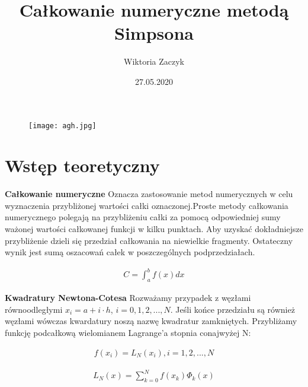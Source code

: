 \documentclass{article}
\begin{document}
\title{Całkowanie numeryczne metodą Simpsona}
\author{Wiktoria Zaczyk}
\date{27.05.2020}

\maketitle

\begin{figure}[H]
\begin{center}
\texttt{[image: agh.jpg]}
\label{pierwszy} 
\end{center}
\end{figure}

\section{Wstęp teoretyczny}
\textbf{Całkowanie numeryczne}
\newline
Oznacza zastosowanie metod numerycznych w celu wyznaczenia przybliżonej wartości całki oznaczonej.Proste metody całkowania numerycznego polegają na przybliżeniu całki za pomocą odpowiedniej sumy ważonej wartości całkowanej funkcji w kilku punktach. Aby uzyskać dokładniejsze przybliżenie dzieli się przedział całkowania na niewielkie fragmenty. Ostateczny wynik jest sumą oszacowań całek w poszczególnych podprzedziałach.

\begin{equation}
\begin{array}{c}
C = \displaystyle \int_{a}^{b} f(x)dx 
\end{array}
\end{equation}

\newline
\setlength{\parindent}{0pt}
\textbf{Kwadratury Newtona-Cotesa}
\newline
Rozważamy przypadek z węzłami równoodległymi $x_i=a+i\cdot h$,  $i=0,1,2,...,N$. Jeśli końce przedziału są również węzłami wówczas
kwardatury noszą nazwę kwadratur zamkniętych. Przybliżamy funkcję podcałkową
wielomianem Lagrange'a stopnia conajwyżej N:

\begin{equation}
\begin{array}{c}
f(x_i)=\displaystyle L_N(x_i), i=1,2,...,N
\end{array}
\end{equation}

\begin{equation}
\begin{array}{c}
L_N(x)=\displaystyle \sum^N_{k=0} f(x_k)\Phi_k(x)
\end{array}
\end{equation}
\end{document}
